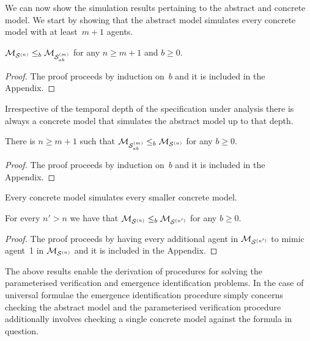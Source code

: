 We can now show the simulation results pertaining to the abstract and
concrete model.  We start by showing that the abstract model simulates every
concrete model with at least~$m+1$ agents.

\begin{theorem}
\label{th:ab-concr-sim}
$\mathcal{M}_{\mathcal{S}^{(n)}} \leq_b \mathcal{M}_{\mathcal{S}_{ab}^{(m)}}$ for any $n \geq m+1$ and $b \geq 0$.
\end{theorem}
\begin{proof}
The proof proceeds by induction on~$b$ and it is included in the Appendix.
\end{proof}

Irrespective of the temporal depth of the specification under
analysis there is always a concrete model that simulates the abstract model up
to that depth.

\begin{theorem}
\label{th:concr-ab-sim}
There is $n \geq m+1$ such that $\mathcal{M}_{\mathcal{S}_{ab}^{(m)}} \leq_b \mathcal{M}_{\mathcal{S}^{(n)}}$ for any $b \geq 0$.
\end{theorem}
\begin{proof}
The proof proceeds by induction on~$b$ and it is included in the Appendix.
\end{proof}


Every concrete model simulates every smaller concrete model.

\begin{theorem}
\label{th:concr-sim}
For every $n' > n$ we have that $\mathcal{M}_{\mathcal{S}^{(n)}} \leq_b \mathcal{M}_{\mathcal{S}^{(n')}}$ for any
$b \geq 0$.
\end{theorem}
\begin{proof}
The proof proceeds by having every additional agent in $\mathcal{M}_{\mathcal{S}^{(n')}}$ to mimic
agent~1 in $\mathcal{M}_{\mathcal{S}^{(n)}}$ and it is included in the Appendix.
\end{proof}

The above results enable the derivation of procedures for solving
the parameterised verification and emergence identification problems. In the case
of universal formulae the emergence identification procedure simply concerns
checking the abstract model and the parameterised verification procedure 
additionally involves checking a single concrete model against the formula in
question.

